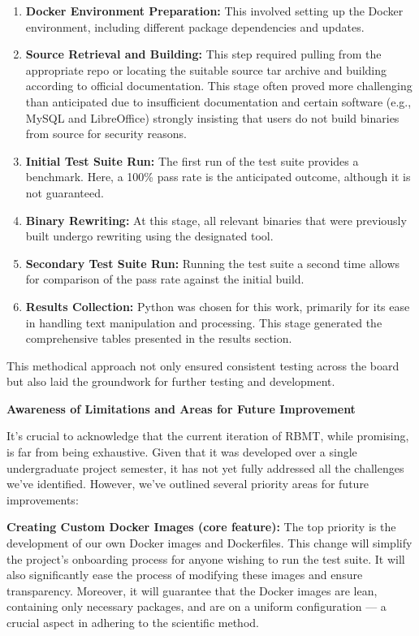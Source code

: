 \documentclass[a4paper,11pt,oneside]{report}
\begin{document}
\begin{enumerate}
    \item \textbf{Docker Environment Preparation:} This involved setting up the Docker environment, including different package dependencies and updates.
    
    \item \textbf{Source Retrieval and Building:} This step required pulling from the appropriate repo or locating the suitable source tar archive and 
    building according to official documentation. This stage often proved more challenging than anticipated due to insufficient documentation and 
    certain software (e.g., MySQL and LibreOffice) strongly insisting that users do not build binaries from source for security reasons.
    
    \item \textbf{Initial Test Suite Run:} The first run of the test suite provides a benchmark. Here, a 100\% pass rate is the anticipated outcome, 
    although it is not guaranteed.
    
    \item \textbf{Binary Rewriting:} At this stage, all relevant binaries that were previously built undergo rewriting using the designated tool.
    
    \item \textbf{Secondary Test Suite Run:} Running the test suite a second time allows for comparison of the pass rate against the initial build.
    
    \item \textbf{Results Collection:} Python was chosen for this work, primarily for its ease in handling text manipulation and processing. 
    This stage generated the comprehensive tables presented in the results section.
\end{enumerate}

This methodical approach not only ensured consistent testing across the board but also laid the groundwork for further testing and development.

\textbf{Awareness of Limitations and Areas for Future Improvement}

It's crucial to acknowledge that the current iteration of RBMT, while promising, is far
from being exhaustive. Given that it was developed over a single undergraduate project
semester, it has not yet fully addressed all the challenges we've identified. However, we've
outlined several priority areas for future improvements:

\textbf{Creating Custom Docker Images (core feature):} The top priority is the development
of our own Docker images and Dockerfiles. This change will simplify the project's
onboarding process for anyone wishing to run the test suite. It will also significantly ease the
process of modifying these images and ensure transparency. Moreover, it will guarantee
that the Docker images are lean, containing only necessary packages, and are on a uniform
configuration — a crucial aspect in adhering to the scientific method.
\end{document}
